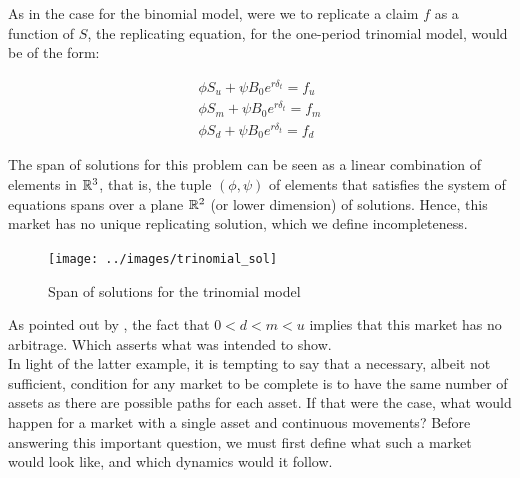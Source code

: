 \documentclass[../TGMAFFIRO.tex]{subfiles}
\begin{document}
As in the case for the binomial model, were we to replicate a claim $f$ as a function of $S$, the replicating equation, for the one-period trinomial model, would be of the form:

\begin{align*}
    \phi S_u + \psi B_0e^{r \delta_t} = f_u\\
    \phi S_m + \psi B_0e^{r \delta_t} = f_m\\
    \phi S_d + \psi B_0e^{r \delta_t} = f_d
\end{align*}

The span of solutions for this problem can be seen as a linear combination of elements in $\mathbb{R}^3$, that is, the tuple $(\phi, \psi)$ of elements that satisfies the system of equations spans over a plane $\mathbb{R}^2$ (or lower dimension) of solutions. Hence, this market has no unique replicating solution, which we define incompleteness.\\

\begin{figure}[hbt!]
  \texttt{[image: ../images/trinomial\_sol]}
  \caption{Span of solutions for the trinomial model}
\end{figure}

As pointed out by , the fact that $0 < d < m < u$ implies that this market has no arbitrage. Which asserts what was intended to show.\\

In light of the latter example, it is tempting to say that a necessary, albeit not sufficient, condition for any market to be complete is to have the same number of assets as there are possible paths for each asset. If that were the case, what would happen for a market with a single asset and continuous movements? Before answering this important question, we must first define what such a market would look like, and which dynamics would it follow.\\
\end{document}
